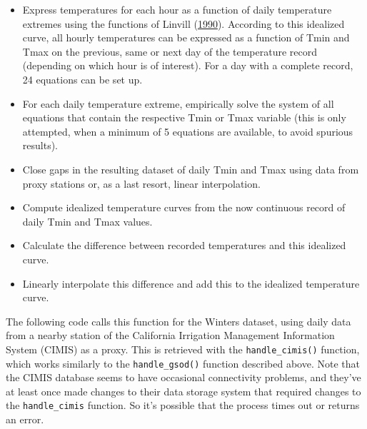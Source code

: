 \documentclass[
]{book}
\newenvironment{Shaded}{\begin{snugshade}}{\end{snugshade}}
\newcommand{\DataTypeTok}[1]{\textcolor[rgb]{0.13,0.29,0.53}{#1}}
\newcommand{\DecValTok}[1]{\textcolor[rgb]{0.00,0.00,0.81}{#1}}
\newcommand{\FloatTok}[1]{\textcolor[rgb]{0.00,0.00,0.81}{#1}}
\newcommand{\KeywordTok}[1]{\textcolor[rgb]{0.13,0.29,0.53}{\textbf{#1}}}
\newcommand{\NormalTok}[1]{#1}
\newcommand{\OperatorTok}[1]{\textcolor[rgb]{0.81,0.36,0.00}{\textbf{#1}}}
\newcommand{\StringTok}[1]{\textcolor[rgb]{0.31,0.60,0.02}{#1}}
\begin{document}
\begin{itemize}
\item
  Express temperatures for each hour as a function of daily temperature extremes using the functions of Linvill (\protect\hyperlink{ref-linvill1990calculating}{1990}). According to this idealized curve, all hourly temperatures can be expressed as a function of Tmin and Tmax on the previous, same or next day of the temperature record (depending on which hour is of interest). For a day with a complete record, 24 equations can be set up.
\item
  For each daily temperature extreme, empirically solve the system of all equations that contain the respective Tmin or Tmax variable (this is only attempted, when a minimum of 5 equations are available, to avoid spurious results).
\item
  Close gaps in the resulting dataset of daily Tmin and Tmax using data from proxy stations or, as a last resort, linear interpolation.
\item
  Compute idealized temperature curves from the now continuous record of daily Tmin and Tmax values.
\item
  Calculate the difference between recorded temperatures and this idealized curve.
\item
  Linearly interpolate this difference and add this to the idealized temperature curve.
\end{itemize}

The following code calls this function for the Winters dataset, using daily data from a nearby station of the California Irrigation Management Information System (CIMIS) as a proxy. This is retrieved with the \texttt{handle\_cimis()} function, which works similarly to the \texttt{handle\_gsod()} function described above. Note that the CIMIS database seems to have occasional connectivity problems, and they've at least once made changes to their data storage system that required changes to the \texttt{handle\_cimis} function. So it's possible that the process times out or returns an error.

\begin{Shaded}
\end{Shaded}
\end{document}
